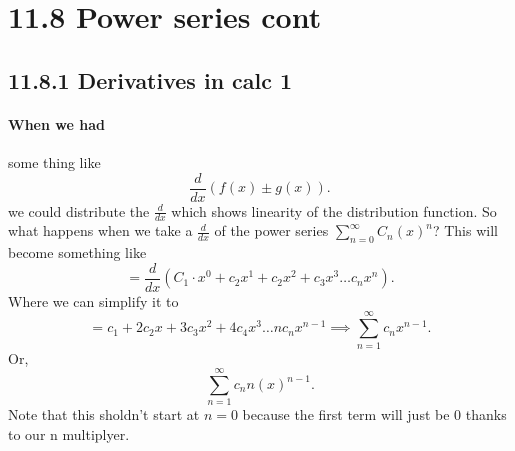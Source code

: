 \section*{11.8 Power series cont}%
\label{sec:11.8 Power series cont}
\subsection*{11.8.1 Derivatives in calc 1}%
\label{sub:11.8.1 Derivatives in calc 1}
\paragraph{When we had} some thing like \[
\frac{ d }{ dx } \left( f\left( x \right) \pm g\left( x \right)  \right) 
.\] 
we could distribute the $ \frac{ d }{ dx }  $ which shows linearity of the distribution function. So what happens when we take a $ \frac{ d }{ dx }  $ of the power series $ \sum_{ n=0 } ^{ \infty } C_n \left( x \right) ^{ n } $? This will become something like
\[
=\frac{ d }{ dx } \left( C_1 \cdot x^{ 0 }+c_2x^{ 1 }+c_2x^2+c_3x^3 \ldots c_nx^{ n }\right) 
.\] 
Where we can simplify it to 
\[
= c_1+2c_2x+3c_3x^2+4c_4x^3 \ldots nc_nx^{ n-1 } \implies \sum_{ n=1 } ^{ \infty } c_nx^{ n-1 }
.\] 
Or,
\[
\sum_{ n=1 } ^{ \infty } c_nn\left( x \right) ^{ n-1 }
.\] 
Note that this sholdn't start at $ n=0 $ because the first term will just be 0 thanks to our n multiplyer. 
